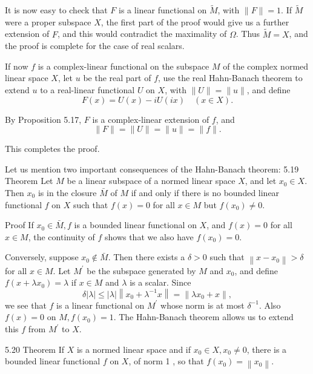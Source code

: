 It is now easy to check that $F$ is a linear functional on $\tilde{M}$, with $\|F\|=1$. If $\tilde{M}$ were a proper subspace $X$, the first part of the proof would give us a further extension of $F$, and this would contradict the maximality of $\Omega$. Thus $\tilde{M}=X$, and the proof is complete for the case of real scalars.

If now $f$ is a complex-linear functional on the subspace $M$ of the complex normed linear space $X$, let $u$ be the real part of $f$, use the real Hahn-Banach theorem to extend $u$ to a real-linear functional $U$ on $X$, with $\|U\|=\|u\|$, and define
$$
F(x)=U(x)-i U(i x) \quad(x \in X) .
$$

By Proposition 5.17, $F$ is a complex-linear extension of $f$, and
$$
\|F\|=\|U\|=\|u\|=\|f\| .
$$

This completes the proof.


Let us mention two important consequences of the Hahn-Banach theorem:
5.19 Theorem Let $M$ be a linear subspace of a normed linear space $X$, and let $x_0 \in X$. Then $x_0$ is in the closure $\bar{M}$ of $M$ if and only if there is no bounded linear functional $f$ on $X$ such that $f(x)=0$ for all $x \in M$ but $f\left(x_0\right) \neq 0$.

Proof If $x_0 \in \bar{M}, f$ is a bounded linear functional on $X$, and $f(x)=0$ for all $x \in M$, the continuity of $f$ shows that we also have $f\left(x_0\right)=0$.

Conversely, suppose $x_0 \notin \bar{M}$. Then there exists a $\delta>0$ such that $\left\|x-x_0\right\|>\delta$ for all $x \in M$. Let $M^{\prime}$ be the subspace generated by $M$ and $x_0$, and define $f\left(x+\lambda x_0\right)=\lambda$ if $x \in M$ and $\lambda$ is a scalar. Since
$$
\delta|\lambda| \leq|\lambda|\left\|x_0+\lambda^{-1} x\right\|=\left\|\lambda x_0+x\right\|,
$$
we see that $f$ is a linear functional on $M^{\prime}$ whose norm is at most $\delta^{-1}$. Also $f(x)=0$ on $M, f\left(x_0\right)=1$. The Hahn-Banach theorem allows us to extend this $f$ from $M^{\prime}$ to $X$.

5.20 Theorem If $X$ is a normed linear space and if $x_0 \in X, x_0 \neq 0$, there is a bounded linear functional $f$ on $X$, of norm 1 , so that $f\left(x_0\right)=\left\|x_0\right\|$.

